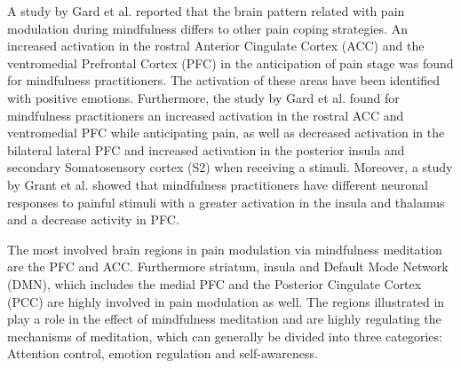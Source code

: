 
A study by Gard et al. \cite{Gard2012} reported that the brain pattern related with pain modulation during mindfulness differs to other pain coping strategies. An increased activation in the rostral Anterior Cingulate Cortex (ACC) and the ventromedial Prefrontal Cortex (PFC) in the anticipation of pain stage was found for mindfulness practitioners. The activation of these areas have been identified with positive emotions. \cite{Gard2012} Furthermore, the study by Gard et al. \cite{Gard2012} found for mindfulness practitioners an increased activation in the rostral ACC and ventromedial PFC while anticipating pain, as well as decreased activation in the bilateral lateral PFC and increased activation in the posterior insula and secondary Somatosensory cortex (S2) when receiving a stimuli. Moreover, a study by Grant et al. \cite{Grant2011} showed that mindfulness practitioners have different neuronal responses to painful stimuli with a greater activation in the insula and thalamus and a decrease activity in PFC.



The most involved brain regions in pain modulation via mindfulness meditation are the PFC and ACC. %
Furthermore striatum, insula and Default Mode Network (DMN), which includes the medial PFC and the Posterior Cingulate Cortex (PCC) are highly involved in pain modulation as well. %
The regions illustrated in  play a role in the effect of mindfulness meditation and are highly regulating the mechanisms of meditation, which can generally be divided into three categories: Attention control, emotion regulation and self-awareness. \cite{Zeidan2012, Tang2017, Perlman2010, Zeidan2011, Brown2010, Lutz2013, Gard2012}

